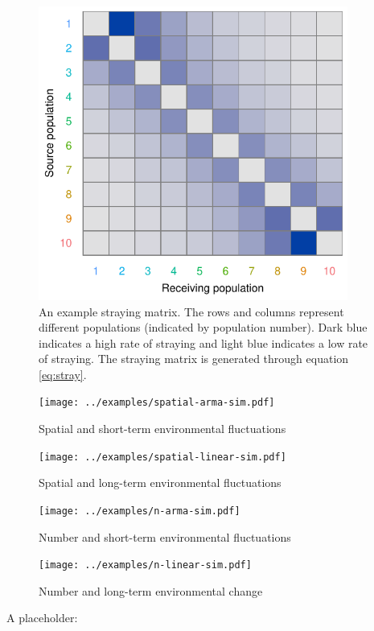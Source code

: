\clearpage

\begin{figure}[htbp]
\centering
\includegraphics[width=4.0in]{../examples/figure/stray-matrix.pdf}
\caption{An example straying matrix. The rows and columns represent different 
populations (indicated by population number). Dark blue indicates a high rate 
of straying and light blue indicates a low rate of straying. The straying 
matrix is generated through equation \ref{eq:stray}.}
\label{f:stray}
\end{figure}

\clearpage

\begin{figure}[htbp]
\centering
\texttt{[image: ../examples/spatial-arma-sim.pdf]}
\caption{Spatial and short-term environmental fluctuations}
\label{f:eg-sp-arma}
\end{figure}

\clearpage

\begin{figure}[htbp]
\centering
\texttt{[image: ../examples/spatial-linear-sim.pdf]}
\caption{Spatial and long-term environmental fluctuations}
\label{f:eg-sp-linear}
\end{figure}

\clearpage

\begin{figure}[htbp]
\centering
\texttt{[image: ../examples/n-arma-sim.pdf]}
\caption{Number and short-term environmental fluctuations}
\label{f:eg-n-arma}
\end{figure}

\clearpage

\begin{figure}[htbp]
\centering
\texttt{[image: ../examples/n-linear-sim.pdf]}
\caption{Number and long-term environmental change}
\label{f:eg-n-linear}
\end{figure}

\clearpage

A placeholder: \citep{schindler2010}




